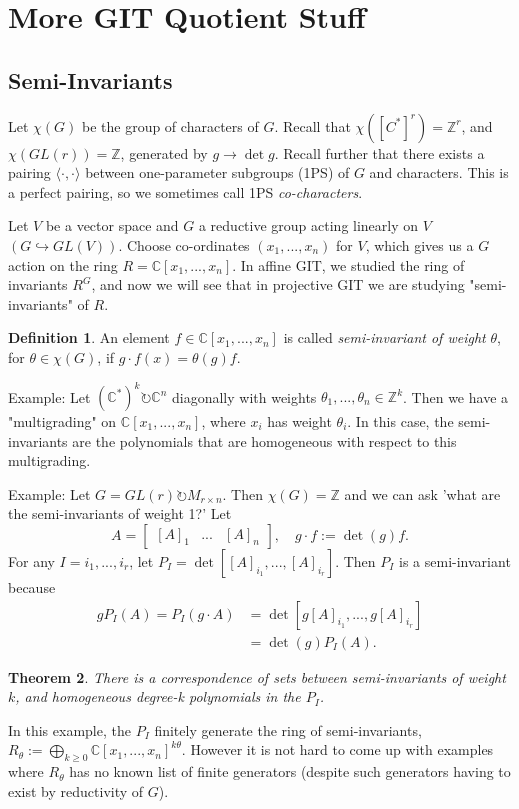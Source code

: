 \documentclass{article}
\newtheorem{theorem}{Theorem}
\theoremstyle{definition}
\newtheorem{definition}[theorem]{Definition}
\theoremstyle{remark}
\numberwithin{theorem}{section}
\newcommand{\C}{\mathbb{C}}
\newenvironment{defn}{
	\begin{mdframed}
		\vspace{-0.5em}
		\begin{definition}
		}{
		\end{definition}
	\end{mdframed}
}
\begin{document}
			\section{More GIT Quotient Stuff}
			\subsection{Semi-Invariants}
			Let $\chi(G)$ be the group of characters of $G$. Recall that $\chi([C^\ast]^r)=\mathbb{Z}^r$, and $\chi(GL(r)) = \mathbb{Z}$, generated by $g\to\det g$. Recall further that there exists a pairing $\langle \cdot , \cdot \rangle$ between one-parameter subgroups (1PS) of $G$ and characters. This is a perfect pairing, so we sometimes call 1PS \emph{co-characters}. \vspace{1em}
			
			Let $V$ be a vector space and $G$ a reductive group acting linearly on $V$ $(G\hookrightarrow GL(V))$. Choose co-ordinates $(x_1,...,x_n)$ for $V$, which gives us a $G$ action on the ring $R=\C[x_1,...,x_n]$. In affine GIT, we studied the ring of invariants $R^G$, and now we will see that in projective GIT we are studying "semi-invariants" of $R$.
			\begin{defn}
				An element $f\in \C[x_1,...,x_n]$ is called \emph{semi-invariant of weight} $\theta$, for $\theta\in \chi(G)$, if $g\cdot f(x) = \theta(g)f$.
			\end{defn}
			Example: Let $(\C^\ast)^k \circlearrowright \C^n$ diagonally with weights $\theta_1,...,\theta_n \in \mathbb{Z}^k$. Then we have a "multigrading" on $\C[x_1,...,x_n]$, where $x_i$ has weight $\theta_i$. In this case, the semi-invariants are the polynomials that are homogeneous with respect to this multigrading. \vspace{1em}
			
			Example: Let $G=GL(r)\circlearrowright M_{r\times n}$. Then $\chi(G)=\mathbb{Z}$ and we can ask 'what are the semi-invariants of weight 1?' Let
			\begin{equation}
			A=\begin{bmatrix}
			[A]_1 & ... & [A]_n
			\end{bmatrix}, \quad g\cdot f := \det(g)f.
			\end{equation}
			For any $I={i_1,...,i_r}$, let $P_I = \det\left[ [A]_{i_1},...,[A]_{i_r} \right]$. Then $P_I$ is a semi-invariant because
			\begin{align*}
				gP_I(A) = P_I(g\cdot A) &= \det\left[ g[A]_{i_1},...,g[A]_{i_r} \right]\\
				&= \det(g)P_I(A).
			\end{align*}
			\begin{theorem}
			There is a correspondence of sets between semi-invariants of weight $k$, and homogeneous degree-k polynomials in the $P_I$.
			\end{theorem}
			In this example, the $P_I$ finitely generate the ring of semi-invariants, $R_\theta := \bigoplus_{k\geq 0} \C[x_1,...,x_n]^{k\theta}$. However it is not hard to come up with examples where $R_\theta$ has no known list of finite generators (despite such generators having to exist by reductivity of $G$).
			
\end{document}
